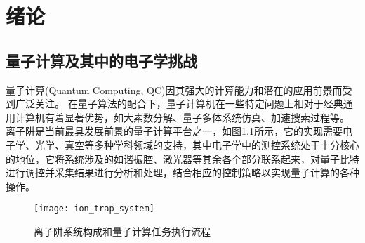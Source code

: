 
\chapter[绪论]{绪论\label{section:introduction}}
\section[量子计算及其中的电子学挑战]{量子计算及其中的电子学挑战}
量子计算(Quantum Computing, QC)因其强大的计算能力和潜在的应用前景而受到广泛关注。
在量子算法的配合下，量子计算机在一些特定问题上相对于经典通用计算机有着显著优势，如大素数分解\cite[]{Shor_1997, Singleton_Jr_2023}、量子多体系统仿真\cite[]{Feynman_1982, Lloyd_1996}、加速搜索过程\cite[]{Grover_2002}等。
离子阱是当前最具发展前景的量子计算平台之一，如图\ref{fig:ion_trap_system}所示，它的实现需要电子学、光学、真空等多种学科领域的支持，其中电子学中的测控系统处于十分核心的地位，它将系统涉及的如谐振腔、激光器等其余各个部分联系起来，对量子比特进行调控并采集结果进行分析和处理，结合相应的控制策略以实现量子计算的各种操作。

\begin{figure}
    \centering
    \texttt{[image: ion\_trap\_system]}
    \caption[离子阱系统构成和量子计算任务执行流程]{离子阱系统构成和量子计算任务执行流程\label{fig:ion_trap_system}}
\end{figure}

